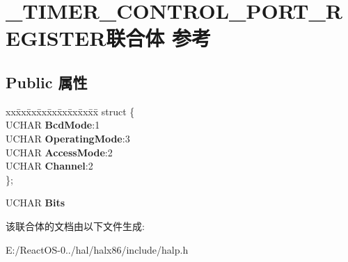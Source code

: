 \hypertarget{union___t_i_m_e_r___c_o_n_t_r_o_l___p_o_r_t___r_e_g_i_s_t_e_r}{}\section{\+\_\+\+T\+I\+M\+E\+R\+\_\+\+C\+O\+N\+T\+R\+O\+L\+\_\+\+P\+O\+R\+T\+\_\+\+R\+E\+G\+I\+S\+T\+E\+R联合体 参考}
\label{union___t_i_m_e_r___c_o_n_t_r_o_l___p_o_r_t___r_e_g_i_s_t_e_r}
\subsection*{Public 属性}
\begin{DoxyCompactItemize}
\item 
\mbox{\label{union___t_i_m_e_r___c_o_n_t_r_o_l___p_o_r_t___r_e_g_i_s_t_e_r_a496678d1d8e435ab9f70790e7499adcc}} 
\begin{tabbing}
xx\=xx\=xx\=xx\=xx\=xx\=xx\=xx\=xx\=\kill
struct \{\\
\>UCHAR {\bfseries BcdMode}:1\\
\>UCHAR {\bfseries OperatingMode}:3\\
\>UCHAR {\bfseries AccessMode}:2\\
\>UCHAR {\bfseries Channel}:2\\
\}; \\

\end{tabbing}\item 
\mbox{\label{union___t_i_m_e_r___c_o_n_t_r_o_l___p_o_r_t___r_e_g_i_s_t_e_r_a470ccff31ef0c3cf1cdd8425473c9258}} 
U\+C\+H\+AR {\bfseries Bits}
\end{DoxyCompactItemize}


该联合体的文档由以下文件生成\+:\begin{DoxyCompactItemize}
\item 
E\+:/\+React\+O\+S-\/0../hal/halx86/include/halp.\+h\end{DoxyCompactItemize}
